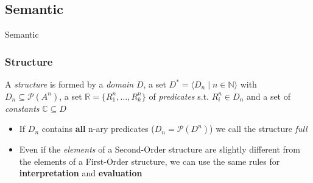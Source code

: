 \documentclass{beamer}
\begin{document}
            \subsection{Semantic}
                \begin{frame}
                    \begin{center}
                        \begin{Huge}
                            \textcolor{title_blue}{Semantic}
                        \end{Huge}
                    \end{center}
                \end{frame}

                \begin{frame}
                    \frametitle{Structure}
                    \begin{definition}
                        A \textit{structure} is formed by a \textit{domain} $ D $, a set $ D^* = \langle D_n\; \vert\; n \in \mathbb{N} \rangle$ with $ D_n \subseteq \mathcal{P}(A^n) $, a set $ \mathbb{R} = \{ R_1^n, \dots, R_k^n \} $ of \textit{predicates} s.t. $ R_i^n \in D_n $ and a set of \textit{constants} $ \mathbb{C} \subseteq D $
                    \end{definition}
                    \begin{itemize}
                        \item If $ D_n $ contains \textbf{all} n-ary predicates ($ D_n = \mathcal{P}(D^n) $) we call the structure \textit{full}
                        \item Even if the \textit{elements} of a Second-Order structure are slightly different from the elements of a First-Order structure, we can use the same rules for \textbf{interpretation} and \textbf{evaluation}
                    \end{itemize}
                \end{frame}
                
\end{document}
